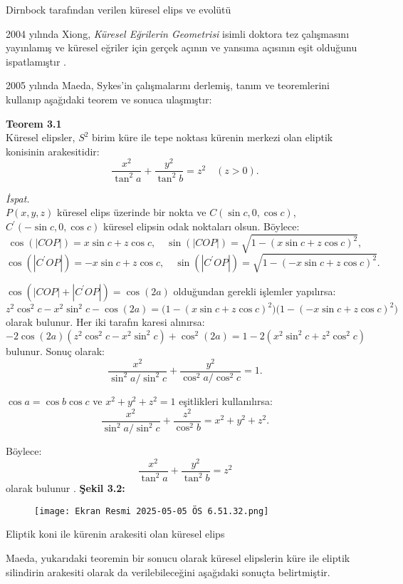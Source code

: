 \documentclass[a4paper,12pt]{article}
\begin{document}
 
 Dirnbock tarafından verilen küresel elips ve evolütü

2004 yılında Xiong, \textit{Küresel Eğrilerin Geometrisi} isimli doktora tez çalışmasını yayınlamış ve küresel eğriler için gerçek açının ve yansıma açısının eşit olduğunu ispatlamıştır   .

2005 yılında Maeda, Sykes’in çalışmalarını derlemiş, tanım ve teoremlerini kullanıp aşağıdaki teorem ve sonuca ulaşmıştır:

\textbf{Teorem 3.1} \\
Küresel elipsler, $S^2$ birim küre ile tepe noktası kürenin merkezi olan eliptik konisinin arakesitidir:
\[
\frac{x^2}{\tan^2 a} + \frac{y^2}{\tan^2 b} = z^2 \quad (z > 0).
\tag{3.3}
\]

\textit{İspat.} \\
$P(x, y, z)$ küresel elips üzerinde bir nokta ve $C(\sin c, 0, \cos c)$, $C^\prime(-\sin c, 0, \cos c)$ küresel elipsin odak noktaları olsun. Böylece:
\[
\cos(|COP|) = x \sin c + z \cos c, \quad \sin(|COP|) = \sqrt{1 - (x \sin c + z \cos c)^2},
\]
\[
\cos(|C^\prime OP|) = -x \sin c + z \cos c, \quad \sin(|C^\prime OP|) = \sqrt{1 - (-x \sin c + z \cos c)^2}.
\]

$\cos(|COP| + |C^\prime OP|) = \cos(2a)$ olduğundan gerekli işlemler yapılırsa:
\[
z^2 \cos^2 c - x^2 \sin^2 c - \cos(2a) = \big(1 - (x \sin c + z \cos c)^2\big)\big(1 - (-x \sin c + z \cos c)^2\big)
\]
olarak bulunur. Her iki tarafın karesi alınırsa:
\[
-2 \cos(2a)(z^2 \cos^2 c - x^2 \sin^2 c) + \cos^2(2a) = 1 - 2(x^2 \sin^2 c + z^2 \cos^2 c)
\]
bulunur. Sonuç olarak:
\[
\frac{x^2}{\sin^2 a / \sin^2 c} + \frac{y^2}{\cos^2 a / \cos^2 c} = 1.
\tag{3.4}
\]

$\cos a = \cos b \cos c$ ve $x^2 + y^2 + z^2 = 1$ eşitlikleri kullanılırsa:
\[
\frac{x^2}{\sin^2 a / \sin^2 c} + \frac{z^2}{\cos^2 b} = x^2 + y^2 + z^2.
\tag{3.5}
\]

Böylece:
\[
\frac{x^2}{\tan^2 a} + \frac{y^2}{\tan^2 b} = z^2
\tag{3.6}
\]
olarak bulunur   .
\textbf{Şekil 3.2:}
\begin{figure}
    \centering
    \texttt{[image: Ekran Resmi 2025-05-05 ÖS 6.51.32.png]}
\end{figure}


Eliptik koni ile kürenin arakesiti olan küresel elips

Maeda, yukarıdaki teoremin bir sonucu olarak küresel elipslerin küre ile eliptik silindirin arakesiti olarak da verilebileceğini aşağıdaki sonuçta belirtmiştir.
\end{document}
